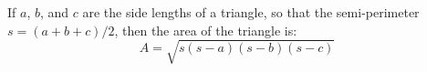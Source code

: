 If $a$, $b$, and $c$ are the side lengths of a triangle, so that  
the semi-perimeter $s=(a+b+c)/2$, then the area of the triangle is:
\[ 
A = \sqrt{s(s-a)(s-b)(s-c)} 
\]